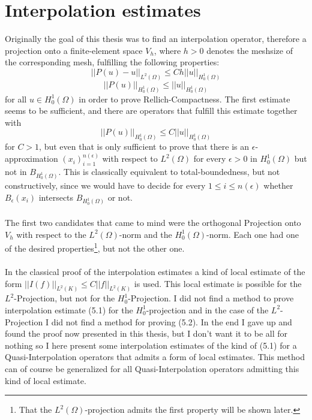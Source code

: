\documentclass[11pt,a4paper,leqno]{report}
\numberwithin{equation}{chapter}
\begin{document}
\section{Interpolation estimates}
Originally the goal of this thesis was to find an interpolation operator, therefore a projection onto a finite-element space $V_h$, where $h>0$ denotes the meshsize of the corresponding mesh, fulfilling the following properties:
\begin{equation}||P(u)-u||_{L^2(\Omega)}\leq C h||u||_{H^1_0(\Omega)}\end{equation}
\begin{equation}||P(u)||_{H^1_0(\Omega)}\leq||u||_{H^1_0(\Omega)}\end{equation}
for all $u\in H^1_0(\Omega)$ in order to prove Rellich-Compactness. The first estimate seems to be sufficient, and there are operators that fulfill this estimate together with
\begin{equation}||P(u)||_{H^1_0(\Omega)}\leq C||u||_{H^1_0(\Omega)}\end{equation}
for $C>1$, but even that is only sufficient to prove that there is an $\epsilon$-approximation $(x_i)_{i=1}^{n(\epsilon)}$ with respect to $L^2(\Omega)$ for every $\epsilon>0$ in $H^1_0(\Omega)$ but not in $B_{H^1_0(\Omega)}$. This is classically equivalent to total-boundedness, but not constructively, since we would have to decide for every $1\leq i\leq n(\epsilon)$ whether $B_\epsilon(x_i)$ intersects $B_{H^1_0(\Omega)}$ or not. 
\\
\\
The first two candidates that came to mind were the orthogonal Projection onto $V_h$ with respect to the $L^2(\Omega)$-norm and the $H^1_0(\Omega)$-norm. Each one had one of the desired properties\footnote{That the $L^2(\Omega)$-projection admits the first property will be shown later.}, but not the other one. \\
\\
In the classical proof of the interpolation estimates a kind of local estimate of the form $||I(f)||_{L^2(K)}\leq C||f||_{L^2(K)}$ is used. This local estimate is possible for the $L^2$-Projection, but not for the $H^1_0$-Projection. I did not find a method to prove interpolation estimate (5.1) for the $H^1_0$-projection and in the case of the $L^2$-Projection I did not find a method for proving (5.2). In the end I gave up and found the proof now presented in this thesis, but I don't want it to be all for nothing so I here present some interpolation estimates of the kind of (5.1) for a Quasi-Interpolation operators that admits a form of local estimates. This method can of course be generalized for all Quasi-Interpolation operators admitting this kind of local estimate.
\end{document}
